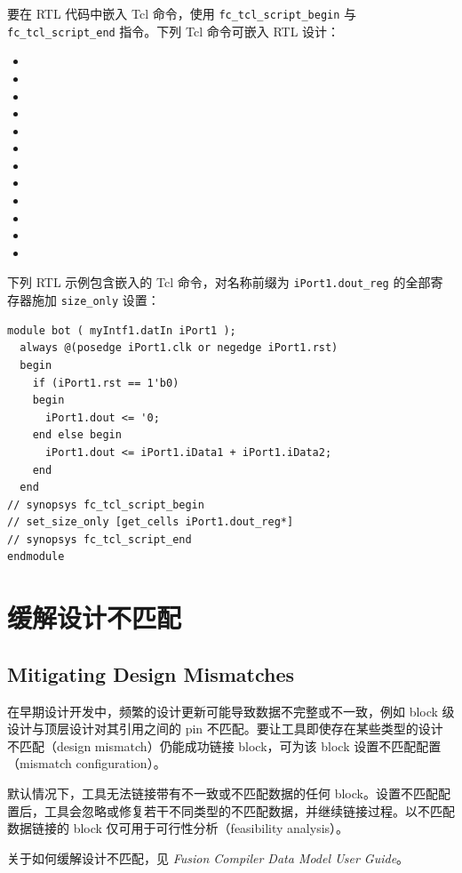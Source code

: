 要在 RTL 代码中嵌入 Tcl 命令，使用 \texttt{fc\_tcl\_script\_begin} 与 \texttt{fc\_tcl\_script\_end} 指令。下列 Tcl 命令可嵌入 RTL 设计：
\begin{itemize}
  \item {}
  \item {}
  \item {}
  \item {}
  \item {}
  \item {}
  \item {}
  \item {}
  \item {}
  \item {}
  \item {}
  \item {}
\end{itemize}

下列 RTL 示例包含嵌入的 Tcl 命令，对名称前缀为 \texttt{iPort1.dout\_reg} 的全部寄存器施加 \texttt{size\_only} 设置：
\begin{lstlisting}
module bot ( myIntf1.datIn iPort1 );
  always @(posedge iPort1.clk or negedge iPort1.rst)
  begin
    if (iPort1.rst == 1'b0)
    begin
      iPort1.dout <= '0;
    end else begin
      iPort1.dout <= iPort1.iData1 + iPort1.iData2;
    end
  end
// synopsys fc_tcl_script_begin
// set_size_only [get_cells iPort1.dout_reg*]
// synopsys fc_tcl_script_end
endmodule
\end{lstlisting}

\section{缓解设计不匹配}
\subsection*{Mitigating Design Mismatches}

在早期设计开发中，频繁的设计更新可能导致数据不完整或不一致，例如 block 级设计与顶层设计对其引用之间的 pin 不匹配。要让工具即使存在某些类型的设计不匹配（design mismatch）仍能成功链接 block，可为该 block 设置不匹配配置（mismatch configuration）。

默认情况下，工具无法链接带有不一致或不匹配数据的任何 block。设置不匹配配置后，工具会忽略或修复若干不同类型的不匹配数据，并继续链接过程。以不匹配数据链接的 block 仅可用于可行性分析（feasibility analysis）。

\begin{seeAlsoBox}
关于如何缓解设计不匹配，见 \textit{Fusion Compiler Data Model User Guide}。
\end{seeAlsoBox}


